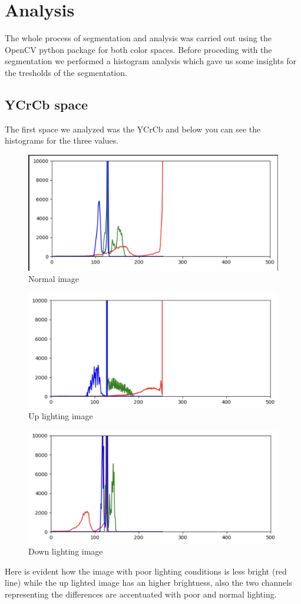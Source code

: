 \documentclass{report}
\begin{document}
\chapter{Analysis}
The whole process of segmentation and analysis was carried out using the OpenCV python package
for both color spaces. Before proceding with the segmentation we performed a histogram analysis
which gave us some insights for the tresholds of the segmentation.
\section{YCrCb space}
The first space we analyzed was the YCrCb and below you can see the histograms for 
the three values.
\begin{figure}[H]
\includegraphics[scale=0.4]{Images/YCRCBNormal.png}
 \caption{Normal image}
\centering
\end{figure}
\begin{figure}[H]
\includegraphics[scale=0.4]{Images/YCRCBUp.png}
 \caption{Up lighting image}
\centering
\end{figure}
\begin{figure}[H]
\includegraphics[scale=0.4]{Images/YCRCBDown.png}
 \caption{Down lighting image}
\centering
\end{figure}
Here is evident how the image with poor lighting conditions is less bright (red line) while the up lighted
image has an higher brightness, also the two channels representing the differences are accentuated
with poor and normal lighting.
\end{document}
